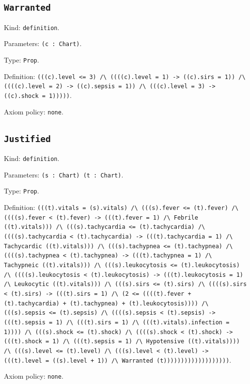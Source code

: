 \documentclass[11pt]{article}
\begin{document}
\subsection*{\texttt{Warranted}}
\noindent Kind: \texttt{definition}.\par
\noindent Parameters: \texttt{(c : Chart)}.\par
\noindent Type: \texttt{Prop}.\par
\noindent Definition: \texttt{(((c).level <= 3) /\textbackslash{} ((((c).level = 1) -> ((c).sirs = 1)) /\textbackslash{} ((((c).level = 2) -> ((c).sepsis = 1)) /\textbackslash{} (((c).level = 3) -> ((c).shock = 1)))))}.\par
\noindent Axiom policy: \texttt{none}.\par
\subsection*{\texttt{Justified}}
\noindent Kind: \texttt{definition}.\par
\noindent Parameters: \texttt{(s : Chart) (t : Chart)}.\par
\noindent Type: \texttt{Prop}.\par
\noindent Definition: \texttt{(((t).vitals = (s).vitals) /\textbackslash{} (((s).fever <= (t).fever) /\textbackslash{} ((((s).fever < (t).fever) -> (((t).fever = 1) /\textbackslash{} Febrile ((t).vitals))) /\textbackslash{} (((s).tachycardia <= (t).tachycardia) /\textbackslash{} ((((s).tachycardia < (t).tachycardia) -> (((t).tachycardia = 1) /\textbackslash{} Tachycardic ((t).vitals))) /\textbackslash{} (((s).tachypnea <= (t).tachypnea) /\textbackslash{} ((((s).tachypnea < (t).tachypnea) -> (((t).tachypnea = 1) /\textbackslash{} Tachypneic ((t).vitals))) /\textbackslash{} (((s).leukocytosis <= (t).leukocytosis) /\textbackslash{} ((((s).leukocytosis < (t).leukocytosis) -> (((t).leukocytosis = 1) /\textbackslash{} Leukocytic ((t).vitals))) /\textbackslash{} (((s).sirs <= (t).sirs) /\textbackslash{} ((((s).sirs < (t).sirs) -> (((t).sirs = 1) /\textbackslash{} (2 <= ((((t).fever + (t).tachycardia) + (t).tachypnea) + (t).leukocytosis)))) /\textbackslash{} (((s).sepsis <= (t).sepsis) /\textbackslash{} ((((s).sepsis < (t).sepsis) -> (((t).sepsis = 1) /\textbackslash{} (((t).sirs = 1) /\textbackslash{} (((t).vitals).infection = 1)))) /\textbackslash{} (((s).shock <= (t).shock) /\textbackslash{} ((((s).shock < (t).shock) -> (((t).shock = 1) /\textbackslash{} (((t).sepsis = 1) /\textbackslash{} Hypotensive ((t).vitals)))) /\textbackslash{} (((s).level <= (t).level) /\textbackslash{} (((s).level < (t).level) -> (((t).level = ((s).level + 1)) /\textbackslash{} Warranted (t)))))))))))))))))))}.\par
\noindent Axiom policy: \texttt{none}.\par
\end{document}

